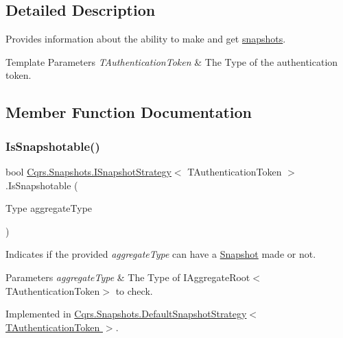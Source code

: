 \subsection{Detailed Description}
Provides information about the ability to make and get \hyperlink{classCqrs_1_1Snapshots_1_1Snapshot}{snapshots}. 


\begin{DoxyTemplParams}{Template Parameters}
{\em T\+Authentication\+Token} & The Type of the authentication token.\\
\hline
\end{DoxyTemplParams}


\subsection{Member Function Documentation}
\mbox{\label{interfaceCqrs_1_1Snapshots_1_1ISnapshotStrategy_a02121821312c4ce2811b31eeaffabe51_a02121821312c4ce2811b31eeaffabe51}} 
\subsubsection{\texorpdfstring{Is\+Snapshotable()}{IsSnapshotable()}}
{\footnotesize\ttfamily bool \hyperlink{interfaceCqrs_1_1Snapshots_1_1ISnapshotStrategy}{Cqrs.\+Snapshots.\+I\+Snapshot\+Strategy}$<$ T\+Authentication\+Token $>$.Is\+Snapshotable (\begin{DoxyParamCaption}\item[{Type}]{aggregate\+Type }\end{DoxyParamCaption})}



Indicates if the provided {\itshape aggregate\+Type}  can have a \hyperlink{classCqrs_1_1Snapshots_1_1Snapshot}{Snapshot} made or not. 


\begin{DoxyParams}{Parameters}
{\em aggregate\+Type} & The Type of I\+Aggregate\+Root$<$\+T\+Authentication\+Token$>$ to check.\\
\hline
\end{DoxyParams}


Implemented in \hyperlink{classCqrs_1_1Snapshots_1_1DefaultSnapshotStrategy_acdbb918ac01b526aedb5fa9a3879887a_acdbb918ac01b526aedb5fa9a3879887a}{Cqrs.\+Snapshots.\+Default\+Snapshot\+Strategy$<$ T\+Authentication\+Token $>$}.

